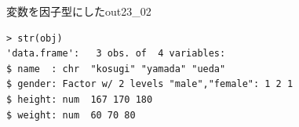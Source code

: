 \begin{Rscreen}{変数を因子型にした}{out23_02}
	\begin{verbatim}
> str(obj)
'data.frame':	3 obs. of  4 variables:
$ name  : chr  "kosugi" "yamada" "ueda"
$ gender: Factor w/ 2 levels "male","female": 1 2 1
$ height: num  167 170 180
$ weight: num  60 70 80
\end{verbatim}
\end{Rscreen}
